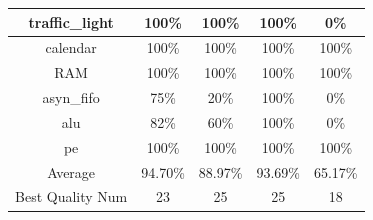 \begin{tabular}{c|cc|cc}
traffic\_light & \color{black} {\cellcolor{lightblue}} 100\% & \color{black} {\cellcolor{lightgreen}} 100\% & \color{black} {\cellcolor{lightblue}} 100\% & 0\% \\ \midrule
calendar & \color{black} {\cellcolor{lightblue}} 100\% & \color{black} {\cellcolor{lightgreen}} 100\% & \color{black} {\cellcolor{lightblue}} 100\% & \color{black} {\cellcolor{lightgreen}} 100\% \\ \midrule
RAM & \color{black} {\cellcolor{lightblue}} 100\% & \color{black} {\cellcolor{lightgreen}} 100\% & \color{black} {\cellcolor{lightblue}} 100\% & \color{black} {\cellcolor{lightgreen}} 100\% \\ \midrule
asyn\_fifo & 75\% & \color{black} {\cellcolor{lightgreen}} 20\% & \color{black} {\cellcolor{lightblue}} 100\% & 0\% \\ \midrule
alu & 82\% & \color{black} {\cellcolor{lightgreen}} 60\% & \color{black} {\cellcolor{lightblue}} 100\% & 0\% \\ \midrule
pe & \color{black} {\cellcolor{lightblue}} 100\% & \color{black} {\cellcolor{lightgreen}} 100\% & \color{black} {\cellcolor{lightblue}} 100\% & \color{black} {\cellcolor{lightgreen}} 100\% \\ \midrule
Average & \color{black} {\cellcolor{lightblue}} 94.70\% & \color{black} {\cellcolor{lightgreen}} 88.97\% & 93.69\% & 65.17\% \\ \midrule
Best Quality Num & 23 & \color{black} {\cellcolor{lightgreen}} 25 & \color{black} {\cellcolor{lightblue}} 25 & 18 \\
\bottomrule
\end{tabular}
